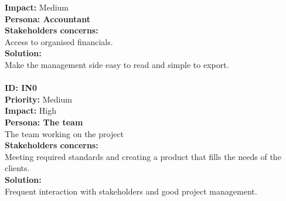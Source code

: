 \textbf{Impact:} Medium\\
\textbf{Persona: Accountant\\}
\textbf{Stakeholders concerns:\\}
Access to organised financials.\\
\textbf{Solution:\\}
Make the management side easy to read and simple to export.\\
\\
\textbf{ID: IN0}\\
\textbf{Priority:} Medium\\
\textbf{Impact:} High\\
\textbf{Persona: The team\\}
The team working on the project\\
\textbf{Stakeholders concerns:\\}
Meeting required standards and creating a product that fills the needs of the clients.\\
\textbf{Solution:\\}
Frequent interaction with stakeholders and good project management.\\
\\
